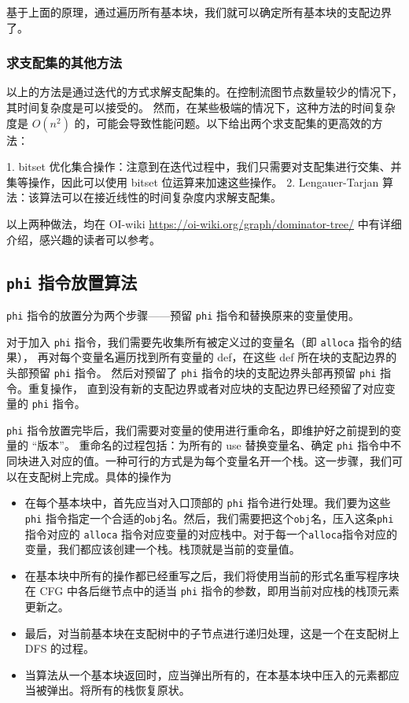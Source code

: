 基于上面的原理，通过遍历所有基本块，我们就可以确定所有基本块的支配边界了。

\subsubsection{求支配集的其他方法}

以上的方法是通过迭代的方式求解支配集的。在控制流图节点数量较少的情况下，其时间复杂度是可以接受的。
然而，在某些极端的情况下，这种方法的时间复杂度是 $O(n^2)$ 的，可能会导致性能问题。以下给出两个求支配集的更高效的方法：

1. bitset 优化集合操作：注意到在迭代过程中，我们只需要对支配集进行交集、并集等操作，因此可以使用 bitset 位运算来加速这些操作。
2. Lengauer-Tarjan 算法：该算法可以在接近线性的时间复杂度内求解支配集。

以上两种做法，均在 OI-wiki \url{https://oi-wiki.org/graph/dominator-tree/} 中有详细介绍，感兴趣的读者可以参考。

\subsection{\texttt{phi} 指令放置算法}

\texttt{phi} 指令的放置分为两个步骤——预留 \texttt{phi} 指令和替换原来的变量使用。

对于加入 \texttt{phi} 指令，我们需要先收集所有被定义过的变量名（即 \texttt{alloca} 指令的结果），
再对每个变量名遍历找到所有变量的 def，在这些 def 所在块的支配边界的头部预留 \texttt{phi} 指令。
然后对预留了 \texttt{phi} 指令的块的支配边界头部再预留 \texttt{phi} 指令。重复操作，
直到没有新的支配边界或者对应块的支配边界已经预留了对应变量的 \texttt{phi} 指令。

\texttt{phi} 指令放置完毕后，我们需要对变量的使用进行重命名，即维护好之前提到的变量的 “版本”。
重命名的过程包括：为所有的 use 替换变量名、确定 \texttt{phi} 指令中不同块进入对应的值。一种可行的方式是为每个变量名开一个栈。这一步骤，我们可以在支配树上完成。具体的操作为
\begin{itemize}
  \item 在每个基本块中，首先应当对入口顶部的 \texttt{phi} 指令进行处理。我们要为这些\texttt{phi} 指令指定一个合适的\texttt{obj}名。然后，我们需要把这个\texttt{obj}名，压入这条\texttt{phi} 指令对应的 \texttt{alloca} 指令对应变量的对应栈中。对于每一个\texttt{alloca}指令对应的变量，我们都应该创建一个栈。栈顶就是当前的变量值。
  \item 在基本块中所有的操作都已经重写之后，我们将使用当前的形式名重写程序块在 CFG 中各后继节点中的适当 \texttt{phi} 指令的参数，即用当前对应栈的栈顶元素更新之。
  \item 最后，对当前基本块在支配树中的子节点进行递归处理，这是一个在支配树上 DFS 的过程。
  \item 当算法从一个基本块返回时，应当弹出所有的，在本基本块中压入的元素都应当被弹出。将所有的栈恢复原状。
\end{itemize}

